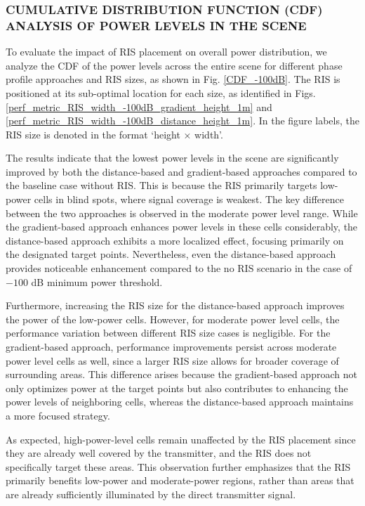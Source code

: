 \documentclass{IEEEoj}
\begin{document}
\subsubsection{CUMULATIVE DISTRIBUTION FUNCTION (CDF) ANALYSIS OF POWER LEVELS IN THE SCENE}
To evaluate the impact of RIS placement on overall power distribution, we analyze the CDF of the power levels across the entire scene for different phase profile approaches and RIS sizes, as shown in Fig. \ref{CDF_-100dB}. The RIS is positioned at its sub-optimal location for each size, as identified in Figs. \ref{perf_metric_RIS_width_-100dB_gradient_height_1m} and \ref{perf_metric_RIS_width_-100dB_distance_height_1m}. In the figure labels, the RIS size is denoted in the format `height × width'.

The results indicate that the lowest power levels in the scene are significantly improved by both the distance-based and gradient-based approaches compared to the baseline case without RIS. This is because the RIS primarily targets low-power cells in blind spots, where signal coverage is weakest. The key difference between the two approaches is observed in the moderate power level range. While the gradient-based approach enhances power levels in these cells considerably, the distance-based approach exhibits a more localized effect, focusing primarily on the designated target points. Nevertheless, even the distance-based approach provides noticeable enhancement compared to the no RIS scenario in the case of $-100$ dB minimum power threshold.

Furthermore, increasing the RIS size for the distance-based approach improves the power of the low-power cells. However, for moderate power level cells, the performance variation between different RIS size cases is negligible. For the gradient-based approach, performance improvements persist across moderate power level cells as well, since a larger RIS size allows for broader coverage of surrounding areas. This difference arises because the gradient-based approach not only optimizes power at the target points but also contributes to enhancing the power levels of neighboring cells, whereas the distance-based approach maintains a more focused strategy.

As expected, high-power-level cells remain unaffected by the RIS placement since they are already well covered by the transmitter, and the RIS does not specifically target these areas. This observation further emphasizes that the RIS primarily benefits low-power and moderate-power regions, rather than areas that are already sufficiently illuminated by the direct transmitter signal.
\end{document}
